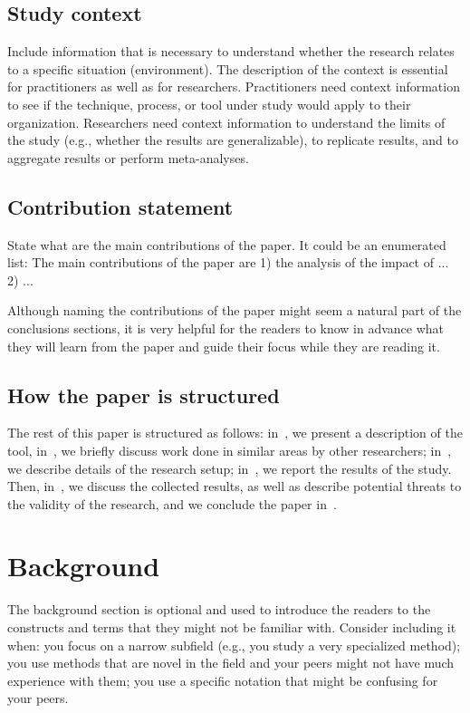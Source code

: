 \documentclass[]{einformatica}
\begin{document}
\subsection*{Study context}
Include information that is necessary to understand whether the research relates to a specific situation (environment).
The description of the context is essential for practitioners as well as for researchers. Practitioners need context information to see if the technique, process, or tool under study would apply to their organization. Researchers need context information to understand the limits of the study (e.g., whether the results are generalizable), to replicate results, and to aggregate results or perform meta-analyses. 

\subsection*{Contribution statement}
State what are the main contributions of the paper. It could be an enumerated list:
The main contributions of the paper are 1) the analysis of the impact of ... 2) ...

Although naming the contributions of the paper might seem a natural part of the conclusions sections, it is very helpful for the readers to know in advance what they will learn from the paper and guide their focus while they are reading it.

\subsection*{How the paper is structured}
The rest of this paper is structured as follows: in~, we present a description of the tool, in~, we briefly discuss work done in similar areas by other researchers; in~, we describe details of the research setup; in~, we report the results of the study. Then, in~, we discuss the collected results, as well as describe potential threats to the validity of the research, and we conclude the paper in~.

\section{Background}\label{sec:Background}

The background section is optional and used to introduce the readers to the constructs and terms that they might not be familiar with. Consider including it when: you focus on a narrow subfield (e.g., you study a very specialized method); you use methods that are novel in the field and your peers might not have much experience with them; you use a specific notation that might be confusing for your peers.
\end{document}
